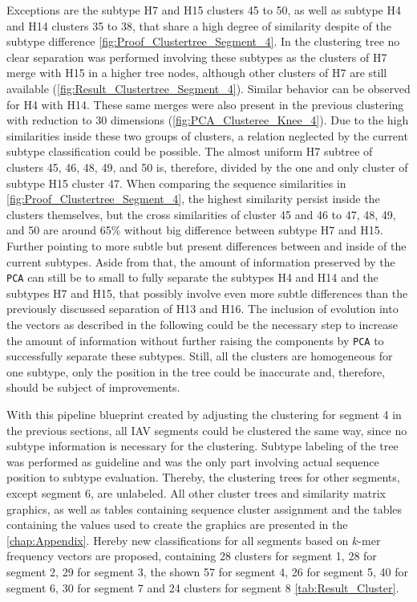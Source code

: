 \vspace{1em}

Exceptions are the subtype H7 and H15 clusters 45 to 50, as well as subtype H4 and H14 clusters 35 to 38, that share a high degree of similarity despite of the subtype difference \autoref{fig:Proof_Clustertree_Segment_4}. In the clustering tree no clear separation was performed involving these subtypes as the clusters of H7 merge with H15 in a higher tree nodes, although other clusters of H7 are still available (\autoref{fig:Result_Clustertree_Segment_4}). Similar behavior can be observed for H4 with H14. These same merges were also present in the previous clustering with reduction to 30 dimensions (\autoref{fig:PCA_Clusteree_Knee_4}). Due to the high similarities inside these two groups of clusters, a relation neglected by the current subtype classification could be possible. The almost uniform H7 subtree of clusters 45, 46, 48, 49, and 50 is, therefore, divided by the one and only cluster of subtype H15 cluster 47. When comparing the sequence similarities in \autoref{fig:Proof_Clustertree_Segment_4}, the highest similarity persist inside the clusters themselves, but the cross similarities of cluster 45 and 46 to 47, 48, 49, and 50 are around 65\% without big difference between subtype H7 and H15. Further pointing to more subtle but present differences between and inside of the current subtypes. Aside from that, the amount of information preserved by the \texttt{PCA} can still be to small to fully separate the subtypes H4 and H14 and the subtypes H7 and H15, that possibly involve even more subtle differences than the previously discussed separation of H13 and H16. The inclusion of evolution into the vectors as described in the following could be the necessary step to increase the amount of information without further raising the components by \texttt{PCA} to successfully separate these subtypes. Still, all the clusters are homogeneous for one subtype, only the position in the tree could be inaccurate and, therefore, should be subject of improvements.  

\vspace{1em}

With this pipeline blueprint created by adjusting the clustering for segment 4 in the previous sections, all \gls{IAV} segments could be clustered the same way, since no subtype information is necessary for the clustering. Subtype labeling of the tree was performed as guideline and was the only part involving actual sequence position to subtype evaluation. Thereby, the clustering trees for other segments, except segment 6, are unlabeled. All other cluster trees and similarity matrix graphics, as well as tables containing sequence cluster assignment and the tables containing the values used to create the graphics are presented in the \autoref{chap:Appendix}. Hereby new classifications for all segments based on $k$-mer frequency vectors are proposed, containing 28 clusters for segment 1, 28 for segment 2, 29 for segment 3, the shown 57 for segment 4, 26 for segment 5, 40 for segment 6, 30 for segment 7 and 24 clusters for segment 8 \autoref{tab:Result_Cluster}. 


